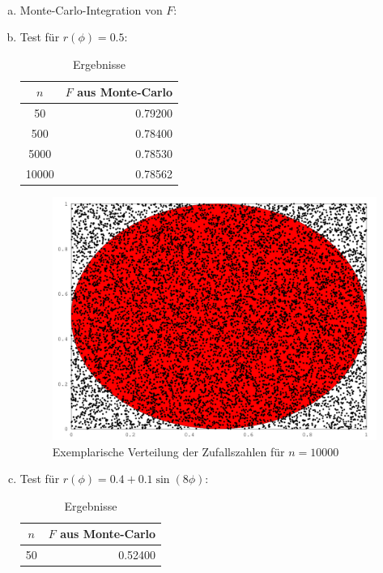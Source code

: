 \documentclass{mywork}
\begin{document}
\begin{aufgabe}~

	\begin{enumerate}[a)]
		\item
			Monte-Carlo-Integration von $F$:
			
		\newpage
		\item
			Test für $r(\phi)=0.5$:
			
			\begin{table}[h]
				\centering
				\caption{Ergebnisse}
				\begin{tabular}{c|r}
					$n$ & $F$ aus Monte-Carlo \\ \hline
					50 & 0.79200 \\
					500 & 0.78400 \\
					5000 & 0.78530 \\
					10000 & 0.78562
				\end{tabular}
			\end{table}
			\begin{figure}[h]
				\centering
				\caption{Exemplarische Verteilung der Zufallszahlen für $n=10000$}
				\includegraphics[scale=0.4]{num1_9_4/b.png}
			\end{figure}
		\newpage
		\item
			Test für $r(\phi)=0.4 + 0.1 \sin(8\phi)$:
			
			\begin{table}[h]
				\centering
				\caption{Ergebnisse}
				\begin{tabular}{c|r}
					$n$ & $F$ aus Monte-Carlo \\ \hline
					50 & 0.52400 \\

\end{tabular}
\end{table}
\end{enumerate}
\end{aufgabe}
\end{document}
